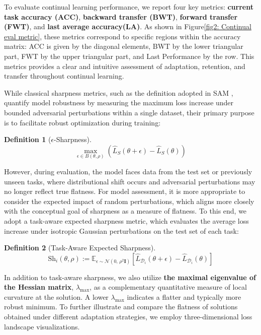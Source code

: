 \documentclass[letterpaper]{article} %
\newtheorem{definition}{Definition}
\begin{document}
To evaluate continual learning performance, we report four key metrics: \textbf{ current task accuracy (ACC)}, \textbf{backward transfer (BWT)}, \textbf{forward transfer (FWT)}, and \textbf{ last average accuracy(LA)}. As shown in Figure\ref{fig2: Continual eval metric}, these metrics correspond to specific regions within the accuracy matrix: ACC is given by the diagonal elements, BWT by the lower triangular part, FWT by the upper triangular part, and Last Performance by the row. This metrics provides a clear and intuitive assessment of adaptation, retention, and transfer throughout continual learning.



While classical sharpness metrics, such as the definition adopted in SAM , quantify model robustness by measuring the maximum loss increase under bounded adversarial perturbations within a single dataset, their primary purpose is to facilitate robust optimization during training:
 \begin{definition}[$\epsilon$-Sharpness]
 \begin{equation}
 \max_{\epsilon \in B(\theta, \rho)}\left(\hat{L}_{S}(\theta+\epsilon)-\hat{L}_{S}(\theta)\right)
 \end{equation}
 \end{definition}
However, during evaluation, the model faces data from the test set or previously unseen tasks, where distributional shift occurs and adversarial perturbations may no longer reflect true flatness. For model assessment, it is more appropriate to consider the expected impact of random perturbations, which aligns more closely with the conceptual goal of sharpness as a measure of flatness. To this end, we adopt a task-aware expected sharpness metric, which evaluates the average loss increase under isotropic Gaussian perturbations on the test set of each task:
 \begin{definition}[Task-Aware Expected Sharpness]\label{def: Task-Aware Expected Sharpness}
 \begin{equation}
 \mathrm{Sh}_{ i}(\theta,\rho) := \mathbb{E}_{\epsilon \sim \mathcal{N}(0,\, \rho^2 \mathbf{I})}  \left[ \hat{L}_{\mathcal{D}_{i}}(\theta + \epsilon) - \hat{L}_{\mathcal{D}_{i}}(\theta) \right]
 \end{equation}
 \end{definition}


In addition to task-aware sharpness, we also utilize \textbf{the maximal eigenvalue of the Hessian matrix}, $\lambda_{\max}$, as a complementary quantitative measure of local curvature at the solution. A lower $\lambda_{\max}$ indicates a flatter and typically more robust minimum. To further illustrate and compare the flatness of solutions obtained under different adaptation strategies, we employ three-dimensional loss landscape visualizations\cite{liVisualizingLossLandscape2018}.
\end{document}
